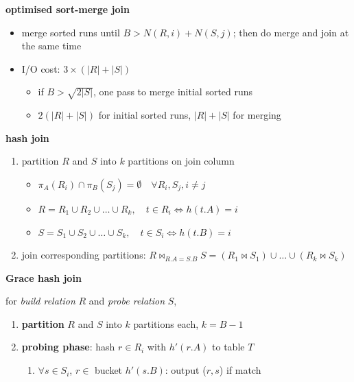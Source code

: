 \documentclass[8pt, landscape]{extarticle}
\begin{document}
\begin{multicols*}{4}
  \textbf{optimised sort-merge join}

  \begin{itemize}
    \item merge sorted runs until $B > N(R, i) + N(S, j)$; then do merge and join at the same time
    \item I/O cost: $3 \times (|R|+|S|)$
      \begin{itemize}
        \item if $B > \sqrt{2|S|}$, one pass to merge initial sorted runs
        \item $2(|R|+|S|)$ for initial sorted runs, $|R|+|S|$ for merging
      \end{itemize}
  \end{itemize}

  \textbf{hash join}

  \begin{enumerate}
    \item partition $R$ and $S$ into $k$ partitions on join column
      \begin{itemize}
        \item $\pi_A(R_i) \cap \pi_B(S_j) = \emptyset \quad \forall R_i, S_j, i \neq j$
        \item $R = R_1 \cup R_2 \cup \dots \cup R_k, \quad t \in R_i \iff h(t.A)=i$
        \item $S = S_1 \cup S_2 \cup \dots \cup S_k, \quad t \in S_i \iff h(t.B)=i$
      \end{itemize}
    \item join corresponding partitions: $R \bowtie_{R.A=S.B} S = (R_1 \bowtie S_1) \cup \dots \cup (R_k \bowtie S_k)$
  \end{enumerate}

  \textbf{Grace hash join}

  for \textit{build relation} $R$ and \textit{probe relation} $S$,
  \begin{enumerate}
    \item \textbf{partition} $R$ and $S$ into  $k$ partitions each, $k=B-1$
    \item \textbf{probing phase}: hash $r \in R_i$ with $h'(r.A)$ to table $T$
      \begin{enumerate}
        \item $\forall s \in S_i$, $r \in$ bucket $h'(s.B)$: output ($r,s$) if match
      \end{enumerate}
  \end{enumerate}


\end{multicols*}
\end{document}
